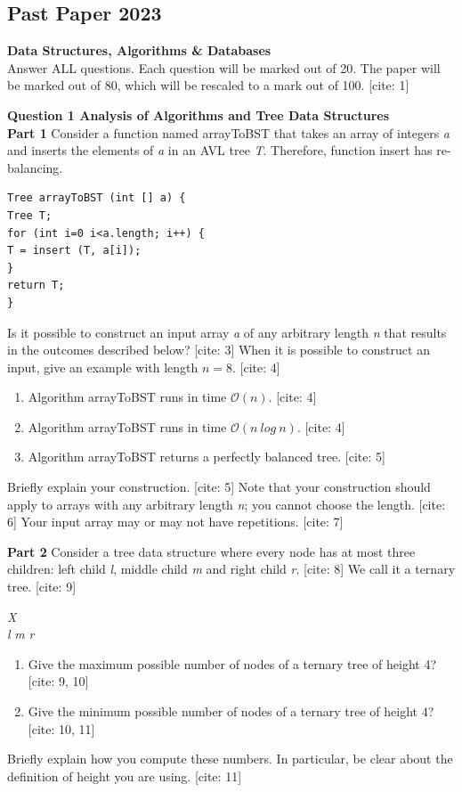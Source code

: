 \subsection{Past Paper 2023} 
\textbf{Data Structures, Algorithms \& Databases} \\
Answer ALL questions. Each question will be marked out of 20. The paper will be marked out of 80, which will be rescaled to a mark out of 100. [cite: 1]

\textbf{Question 1 Analysis of Algorithms and Tree Data Structures} \\
\textbf{Part 1} Consider a function named arrayToBST that takes an array of integers \textit{a} and inserts the elements of \textit{a} in an AVL tree \textit{T}. Therefore, function insert has re-balancing.
\begin{lstlisting}
Tree arrayToBST (int [] a) {
Tree T;
for (int i=0 i<a.length; i++) {
T = insert (T, a[i]);
}
return T;
}
\end{lstlisting} 

Is it possible to construct an input array \textit{a} of any arbitrary length \textit{n} that results in the outcomes described below? [cite: 3]
When it is possible to construct an input, give an example with length $n=8.$ [cite: 4]
\begin{enumerate}
    \item[(a)] Algorithm arrayToBST runs in time $\mathcal{O}(n).$ [cite: 4]
    \item[(b)] Algorithm arrayToBST runs in time $\mathcal{O}(n~log~n)$. [cite: 4]
    \item[(c)] Algorithm arrayToBST returns a perfectly balanced tree. [cite: 5]
\end{enumerate}
Briefly explain your construction. [cite: 5]
Note that your construction should apply to arrays with any arbitrary length \textit{n}; you cannot choose the length. [cite: 6] Your input array may or may not have repetitions. [cite: 7]

\textbf{Part 2} Consider a tree data structure where every node has at most three children: left child \textit{l}, middle child \textit{m} and right child \textit{r}. [cite: 8]
We call it a ternary tree. [cite: 9]
\begin{center}
\textit{X}
\\
\textit{l} \quad \textit{m} \quad \textit{r}
\end{center}
\begin{enumerate}
    \item[(d)] Give the maximum possible number of nodes of a ternary tree of height 4? [cite: 9, 10]
    \item[(e)] Give the minimum possible number of nodes of a ternary tree of height 4? [cite: 10, 11]
\end{enumerate}
Briefly explain how you compute these numbers. In particular, be clear about the definition of height you are using. [cite: 11]

